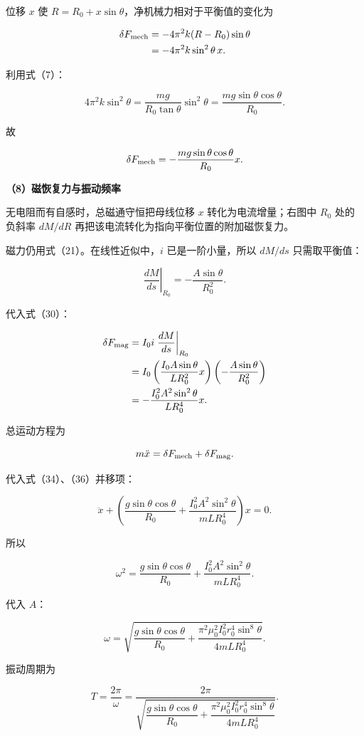 \documentclass[12pt,a4paper,UTF8]{ctexart}
\begin{document}
位移 \(x\) 使 \(R=R_0+x\sin\theta\)，净机械力相对于平衡值的变化为

\[\begin{aligned}
\delta F_{\rm mech}
&=-4\pi^2k(R-R_0)\sin\theta\\
&=-4\pi^2k\sin^2\theta\,x.
\end{aligned}\]

利用式（7）：

\[4\pi^2k\sin^2\theta
=\frac{mg}{R_0\tan\theta}\sin^2\theta
=\frac{mg\sin\theta\cos\theta}{R_0}.\]

故

\[\delta F_{\rm mech}
=-\frac{mg\sin\theta\cos\theta}{R_0}x.\]

\textbf{（8）磁恢复力与振动频率}

无电阻而有自感时，总磁通守恒把母线位移 \(x\) 转化为电流增量；右图中
\(R_0\) 处的负斜率 \(dM/dR\)
再把该电流转化为指向平衡位置的附加磁恢复力。

磁力仍用式（21）。在线性近似中，\(i\) 已是一阶小量，所以 \(dM/ds\)
只需取平衡值：

\[\left.\frac{dM}{ds}\right|_{R_0}
=-\frac{A\sin\theta}{R_0^2}.\]

代入式（30）：

\[\begin{aligned}
\delta F_{\rm mag}
&=I_0i\left.\frac{dM}{ds}\right|_{R_0}\\
&=I_0\left(\frac{I_0A\sin\theta}{LR_0^2}x\right)
\left(-\frac{A\sin\theta}{R_0^2}\right)\\
&=-\frac{I_0^2A^2\sin^2\theta}{LR_0^4}x.
\end{aligned}\]

总运动方程为

\[m\ddot x=\delta F_{\rm mech}+\delta F_{\rm mag}.\]

代入式（34）、（36）并移项：

\[\ddot x+\left(
\frac{g\sin\theta\cos\theta}{R_0}
+\frac{I_0^2A^2\sin^2\theta}{mLR_0^4}
\right)x=0.\]

所以

\[\omega^2=\frac{g\sin\theta\cos\theta}{R_0}
+\frac{I_0^2A^2\sin^2\theta}{mLR_0^4}.\]

代入 \(A\)：

\[\boxed{
\omega=\sqrt{
\frac{g\sin\theta\cos\theta}{R_0}
+\frac{\pi^2\mu_0^2I_0^2r_0^4\sin^8\theta}
{4mLR_0^4}}
}.\]

振动周期为

\[\boxed{
T=\frac{2\pi}{\omega}
=\frac{2\pi}{\sqrt{
\dfrac{g\sin\theta\cos\theta}{R_0}
+\dfrac{\pi^2\mu_0^2I_0^2r_0^4\sin^8\theta}
{4mLR_0^4}}}
}.\]
\end{document}
